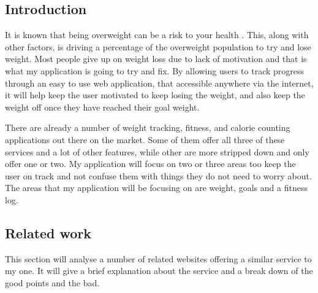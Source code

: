 \subsection{Introduction}
It is known that being overweight can be a risk to your health \citep{theordre1985}. This, along with other factors, is driving a percentage of the overweight population to try and lose weight. Most people give up on weight loss due to lack of motivation and that is what my application is going to try and fix. By allowing users to track progress through an easy to use web application, that accessible anywhere via the internet, it will help keep the user motivated to keep losing the weight, and also keep the weight off once they have reached their goal weight.

There are already a number of weight tracking, fitness, and calorie counting applications out there on the market. Some of them offer all three of these services and a lot of other features, while other are more stripped down and only offer one or two. My application will focus on two or three areas too keep the user on track and not confuse them with things they do not need to worry about. The areas that my application will be focusing on are weight, goals and a fitness log.

\subsection{Related work}
This section will analyse a number of related websites offering a similar service to my one. It will give a brief explanation about the service and a break down of the good points and the bad.

